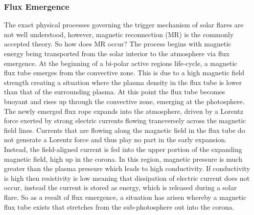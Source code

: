 \subsubsection{Flux Emergence}\label{flux-emerge}
The exact physical processes governing the trigger mechanism of solar flares are not well understood, however, magnetic reconnection (MR) is the commonly accepted theory. So how does MR occur? The process begins with magnetic energy being transported from the solar interior to the atmosphere via flux emergence. At the beginning of a bi-polar active regions life-cycle, a magnetic flux tube emerges from the convective zone. This is due to a high magnetic field strength creating a situation where the plasma density in the flux tube is lower than that of the surrounding plasma. At this point the flux tube becomes buoyant and rises up through the convective zone, emerging at the photosphere. The newly emerged flux rope expands into the atmosphere, driven by a Lorentz force exerted by strong electric currents flowing transversely across the magnetic field lines. Currents that are flowing along the magnetic field in the flux tube do not generate a Lorentz force and thus play no part in the early expansion. Instead, the field-aligned current is fed into the upper portion of the expanding magnetic field, high up in the corona. In this region, magnetic pressure is much greater than the plasma pressure which leads to high conductivity. If conductivity is high then resistivity is low meaning that dissipation of electric current does not occur, instead the current is stored as energy, which is released during a solar flare. So as a result of flux emergence, a situation has arisen whereby a magnetic flux tube exists that stretches from the sub-photosphere out into the corona. 

